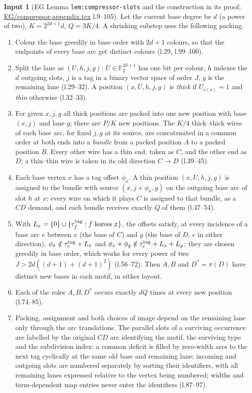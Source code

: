 \documentclass[11pt]{article}
\theoremstyle{definition}
\newtheorem{hyp}{Input}
\theoremstyle{remark}
\newcommand{\F}{\mathbb F}
\newcommand{\src}[1]{\url{#1}}
\begin{document}
\begin{hyp}[EG Lemma \texttt{lem:compressor-slots} and the construction in its proof; \src{EG/compressor-appendix.tex} l.9--105]\label{H9}
Let the current base degree be $d$ (a power of two), $K=2^{2d+1}d$, $Q=3K/4$. A shrinking substep uses the following packing.
\begin{enumerate}
\item[(i)] Colour the base greedily in base order with $2d+1$ colours, so that the endpoints of every base arc get distinct
  colours (l.29, l.99--100).
\item[(ii)] Split the lane as $(U,h,j,g)$: $U\in\F_2^{2d+1}$ has one bit per colour, $h$ indexes the $d$ outgoing slots, $j$
  is a tag in a binary vector space of order $J$, $g$ is the remaining lane (l.29--32). A position $(x,U,h,j,g)$ is
  \emph{thick} if $U_{c(x)}=1$ and \emph{thin} otherwise (l.32--33).
\item[(iii)] For given $x,j,g$ all thick positions are packed into one new position with base $(x,j)$ and lane $g$; there are
  $P/K$ new positions. The $K/4$ thick--thick wires of each base arc, for fixed $j,g$ at its source, are concatenated in a common
  order at both ends into a \emph{bundle} from a packed position $A$ to a packed position $B$. Every other wire has a thin end,
  taken as $C$, and the other end as $D$; a thin--thin wire is taken in its old direction $C\to D$ (l.39--45).
\item[(iv)] Each base vertex $x$ has a tag offset $\phi_x$. A thin position $(x,U,h,j,g)$ is assigned to the bundle with source
  $(x,j+\phi_x,g)$ on the outgoing base arc of slot $h$ at $x$; every wire on which it plays $C$ is assigned to that bundle, as a
  $CD$ demand, and each bundle receives exactly $Q$ of them (l.47--54).
\item[(v)] With $L_x=\{0\}\cup\{\tau^{\rm tag}_f: f\text{ leaves }x\}$, the offsets satisfy, at every incidence of a base arc $e$
  between $x$ (the base of $C$) and $y$ (the base of $D$, $e$ in either direction),
  $\phi_x\notin\tau^{\rm tag}_e+L_x$ and $\phi_x+\phi_y\notin\tau_e^{\rm tag}+L_x+L_y$; they are chosen greedily in base order,
  which works for every power of two $J>2d((d+1)+(d+1)^2)$ (l.56--72). Then $A,B$ and $D^*=\pi(D)$ have distinct new bases in each
  motif, in either layout.
\item[(vi)] Each of the roles $A,B,D^*$ occurs exactly $dQ$ times at every new position (l.74--85).
\item[(vii)] Packing, assignment and both choices of image depend on the remaining lane only through the arc translations. The
  parallel slots of a surviving occurrence are labelled by the original $CD$ arc identifying the motif, the surviving type and the
  subdivision index; a common deficit is filled by zero-width arcs to the next tag cyclically at the same old base and remaining
  lane; incoming and outgoing slots are numbered separately by sorting their identifiers, with all remaining lanes expressed
  relative to the vertex being numbered; widths and term-dependent map entries never enter the identifiers (l.87--97).
\end{enumerate}
\end{hyp}
\end{document}
